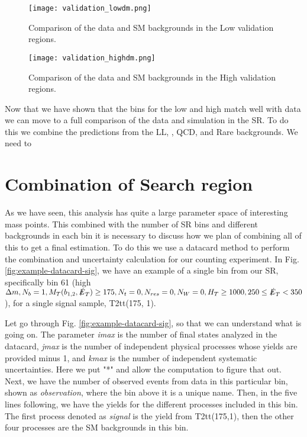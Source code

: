 \begin{figure}
	\begin{center}
  \texttt{[image: validation\_lowdm.png]}
	\end{center}
	\caption[LM Validation Region]{Comparison of the data and SM backgrounds in the Low \dm{} validation regions.
	 }
	\label{fig:validation-region-lm}
\end{figure}

\begin{figure}
	\begin{center}
  \texttt{[image: validation\_highdm.png]}
	\end{center}
	\caption[Lost Lepton HM Control Region]{Comparison of the data and SM backgrounds in the High \dm{} validation regions.
	 }
	\label{fig:validation-region-hm}
\end{figure}

Now that we have shown that the bins for the low and high \dm{} match well with data we can move to a full comparison of the data and simulation in the SR. To do this we combine the predictions from the LL, \Znunu, QCD, and Rare backgrounds. We need to 

\section{Combination of Search region}\label{sec:Combination}

As we have seen, this analysis has quite a large parameter space of interesting mass points. This combined with the number of SR bins and different backgrounds in each bin it is necessary to discuss how we plan of combining all of this to get a final estimation. To do this we use a datacard method to perform the combination and uncertainty calculation for our counting experiment. In Fig. \ref{fig:example-datacard-sig}, we have an example of a single bin from our SR, specifically bin 61 (high $\Delta m, N_{b}=1, M_{T}(b_{1,2},\slashed{E}_{T})\geq175, N_{t}=0, N_{res}=0, N_{W}=0, H_{T}\geq1000, 250\leq\slashed{E}_{T}<350$), for a single signal sample, T2tt(175, 1). 

Let go through Fig. \ref{fig:example-datacard-sig}, so that we can understand what is going on. The parameter \textit{imax} is the number of final states analyzed in the datacard, \textit{jmax} is the number of independent physical processes whose yields are provided minus 1, and \textit{kmax} is the number of independent systematic uncertainties. Here we put "*" and allow the computation to figure that out. Next, we have the number of observed events from data in this particular bin, shown as \textit{observation}, where the bin above it is a unique name. Then, in the five lines following, we have the yields for the different processes included in this bin. The first process denoted as \textit{signal} is the yield from T2tt(175,1), then the other four processes are the SM backgrounds in this bin. 


